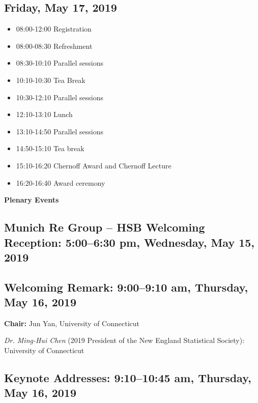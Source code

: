 \documentclass[10pt]{article}
\begin{document}
\begin{large}
\vfill
\subsection*{Friday, May 17, 2019}

\begin{itemize}
\item
  08:00-12:00 \hfill Registration
\item 
  08:00-08:30 \hfill Refreshment
\item
  08:30-10:10 \hfill Parallel sessions
\item
  10:10-10:30 \hfill Tea Break
\item
  10:30-12:10 \hfill Parallel sessions
\item
  12:10-13:10 \hfill Lunch
\item
  13:10-14:50 \hfill Parallel sessions
\item
  14:50-15:10 \hfill Tea break
\item
  15:10-16:20 \hfill Chernoff Award and Chernoff Lecture
\item
  16:20-16:40 \hfill Award ceremony
\end{itemize}
\end{large}

\clearpage
{}
\begin{center}
  {\bf\Huge Plenary Events}
\end{center}

\subsection*{Munich Re Group -- HSB Welcoming Reception: \hfill
  5:00--6:30 pm, Wednesday, May 15, 2019}


\subsection*{Welcoming Remark: \hfill 9:00--9:10 am, Thursday, May 16, 2019}

{\bf Chair:} Jun Yan, University of Connecticut

\emph{Dr. Ming-Hui Chen}
(2019 President of the New England Statistical Society):
University of Connecticut

\subsection*{Keynote Addresses: \hfill 9:10--10:45 am, Thursday, May
  16, 2019}
\end{document}
